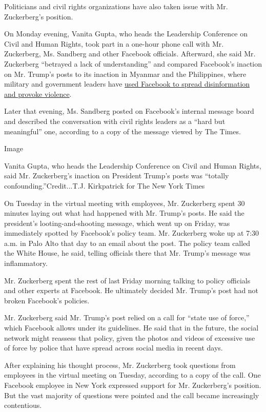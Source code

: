 Politicians and civil rights organizations have also taken issue with
Mr. Zuckerberg's position.

On Monday evening, Vanita Gupta, who heads the Leadership Conference on
Civil and Human Rights, took part in a one-hour phone call with Mr.
Zuckerberg, Ms. Sandberg and other Facebook officials. Afterward, she
said Mr. Zuckerberg ``betrayed a lack of understanding'' and compared
Facebook's inaction on Mr. Trump's posts to its inaction in Myanmar and
the Philippines, where military and government leaders have
\href{https://www.nytimes.com/2018/10/15/technology/myanmar-facebook-genocide.html}{used
Facebook to spread disinformation and provoke violence}.

Later that evening, Ms. Sandberg posted on Facebook's internal message
board and described the conversation with civil rights leaders as a
``hard but meaningful'' one, according to a copy of the message viewed
by The Times.

Image

Vanita Gupta, who heads the Leadership Conference on Civil and Human
Rights, said Mr. Zuckerberg's inaction on President Trump's posts was
``totally confounding.''Credit...T.J. Kirkpatrick for The New York Times

On Tuesday in the virtual meeting with employees, Mr. Zuckerberg spent
30 minutes laying out what had happened with Mr. Trump's posts. He said
the president's looting-and-shooting message, which went up on Friday,
was immediately spotted by Facebook's policy team. Mr. Zuckerberg woke
up at 7:30 a.m. in Palo Alto that day to an email about the post. The
policy team called the White House, he said, telling officials there
that Mr. Trump's message was inflammatory.

Mr. Zuckerberg spent the rest of last Friday morning talking to policy
officials and other experts at Facebook. He ultimately decided Mr.
Trump's post had not broken Facebook's policies.

Mr. Zuckerberg said Mr. Trump's post relied on a call for ``state use of
force,'' which Facebook allows under its guidelines. He said that in the
future, the social network might reassess that policy, given the photos
and videos of excessive use of force by police that have spread across
social media in recent days.

After explaining his thought process, Mr. Zuckerberg took questions from
employees in the virtual meeting on Tuesday, according to a copy of the
call. One Facebook employee in New York expressed support for Mr.
Zuckerberg's position. But the vast majority of questions were pointed
and the call became increasingly contentious.

